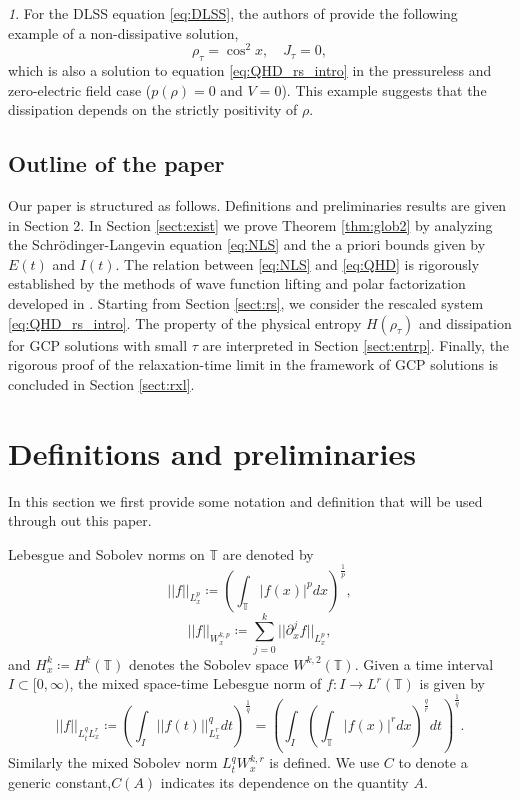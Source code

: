 \documentclass[leqno]{amsart}
\theoremstyle{plain}
\theoremstyle{definition}
\theoremstyle{remark}
\newtheorem{rem}[thm]{\protect\remarkname}
\theoremstyle{plain}
\theoremstyle{plain}
\providecommand{\remarkname}{Remark}
\def\T{{\mathbb T}}%
\numberwithin{equation}{section}
\begin{document}
\begin{rem}
For the DLSS equation \eqref{eq:DLSS}, the authors of \cite{JM} provide the following example of a non-dissipative solution,
\[
\rho_\tau=\cos^2x,\quad J_\tau=0,
\]
which is also a solution to equation \eqref{eq:QHD_rs_intro} in the pressureless and zero-electric field case ($p(\rho)=0$ and $V=0$). This example suggests that the dissipation depends on the strictly positivity of $\rho$.
\end{rem}


\subsection{Outline of the paper}

Our paper is structured as follows. Definitions and preliminaries results are given in Section 2. In Section \ref{sect:exist} we prove   Theorem \ref{thm:glob2} by analyzing the Schr\"odinger-Langevin equation \eqref{eq:NLS} and the a priori bounds given by $E(t)$ and $I(t)$. The relation between \eqref{eq:NLS} and \eqref{eq:QHD} is rigorously established by the methods of wave function lifting and polar factorization developed in \cite{AM1,AM2,AMZ1}. Starting from Section \ref{sect:rs}, we consider the rescaled system \eqref{eq:QHD_rs_intro}. The property of the physical entropy $H(\rho_\tau)$ and dissipation for GCP solutions with small $\tau$ are interpreted in Section \ref{sect:entrp}. Finally, the rigorous proof of the relaxation-time limit in the framework of GCP solutions is concluded in Section \ref{sect:rxl}.

\section{Definitions and preliminaries}\label{sect:def}
In this section we first provide some notation and definition that will be used through out this paper.

Lebesgue and Sobolev norms on $\T$ are denoted by
\[
||f||_{L_{x}^{p}}\coloneqq(\int_{\T}|f(x)|^{p}dx)^{\frac{1}{p}},
\]
\[
||f||_{W_{x}^{k,p}}\coloneqq\sum_{j=0}^k||\partial_{x}^{j}f||_{L_{x}^{p}},
\]
and $H_{x}^{k}\coloneqq H^{k}(\T)$ denotes the Sobolev space $W^{k,2}(\T)$.
Given a time interval $I\subset[0, \infty)$, the mixed space-time Lebesgue norm of $f:I\to L^{r}(\T)$ is
given by
\[
||f||_{L_{t}^{q}L_{x}^{r}}\coloneqq\left(\int_{I}||f(t)||_{L_{x}^{r}}^{q}dt\right)^{\frac{1}{q}}=\left(\int_{I}\left(\int_{\T}|f(x)|^{r}dx\right)^{\frac{q}{r}}dt\right)^{\frac{1}{q}}.
\]
Similarly the mixed
Sobolev norm $L_{t}^{q}W_{x}^{k,r}$ is defined. We use $C$ to denote a generic constant,$C(A)$ indicates its dependence on the quantity $A$.
\end{document}
